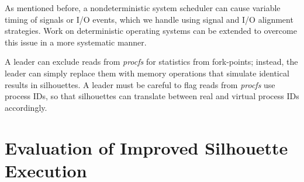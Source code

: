 As mentioned before, a nondeterministic system scheduler
can cause variable timing of signals or I/O events, which
we handle using signal and I/O alignment strategies. 
Work on deterministic operating systems can
be extended to overcome this issue
in a more systematic manner. \newline

 \newline
A leader can exclude reads from {\em procfs}
for statistics from fork-points; instead, the leader can simply replace
them with memory operations that simulate
identical results in silhouettes. A leader
must be careful to flag reads from {\em procfs}
use process IDs, so that silhouettes
can translate between real and virtual process IDs
accordingly.

\newpage
\section{Evaluation of Improved Silhouette Execution} \label{sileval}







